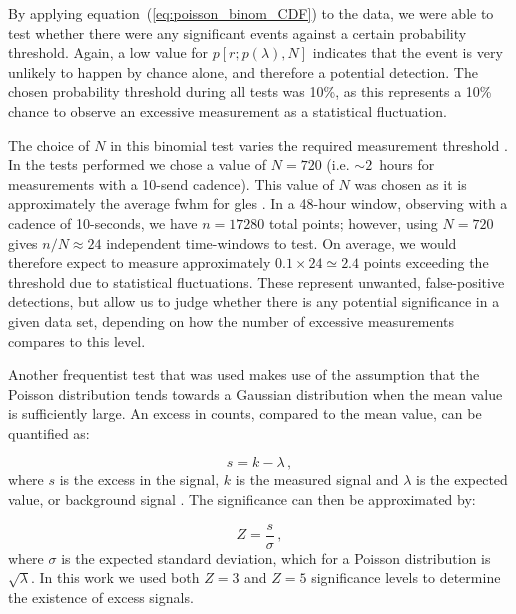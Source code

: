 By applying equation~(\ref{eq:poisson_binom_CDF}) to the data, we were able to test whether there were any significant events against a certain probability threshold. Again, a low value for $p[r; p(\lambda), N]$ indicates that the event is very unlikely to happen by chance alone, and therefore a potential detection. The chosen probability threshold during all tests was 10\%, as this represents a 10\% chance to observe an excessive measurement as a statistical fluctuation.

The choice of $N$ in this binomial test varies the required measurement threshold \citep{basu_asteroseismic_2017}. In the tests performed we chose a value of $N=720$ (i.e. $\sim2$~hours for measurements with a 10-send cadence). This value of $N$ was chosen as it is approximately the average \gls{fwhm} for \glspl{gle} \citep{strauss_pulse_2017}. In a 48-hour window, observing with a cadence of 10-seconds, we have $n=17280$ total points; however, using $N=720$ gives $n/N\approx24$ independent time-windows to test. On average, we would therefore expect to measure approximately $0.1 \times 24 \simeq 2.4$ points exceeding the threshold due to statistical fluctuations. These represent unwanted, false-positive detections, but allow us to judge whether there is any potential significance in a given data set, depending on how the number of excessive measurements compares to this level.


Another frequentist test that was used makes use of the assumption that the Poisson distribution tends towards a Gaussian distribution when the mean value is sufficiently large. An excess in counts, compared to the mean value, can be quantified as:

\begin{equation}
s = k - \lambda \, ,
\label{eq:poisson_excess}
\end{equation}
%
where $s$ is the excess in the signal, $k$ is the measured signal and $\lambda$ is the expected value, or background signal \citep{lista_statistical_2016}. The significance can then be approximated by:

\begin{equation}
Z = \frac{s}{\sigma} \, ,
\label{eq:poisson_significance}
\end{equation}
%
where $\sigma$ is the expected standard deviation, which for a Poisson distribution is $\sqrt{\lambda}$. In this work we used both $Z = 3$ and $Z = 5$ significance levels to determine the existence of excess signals.

